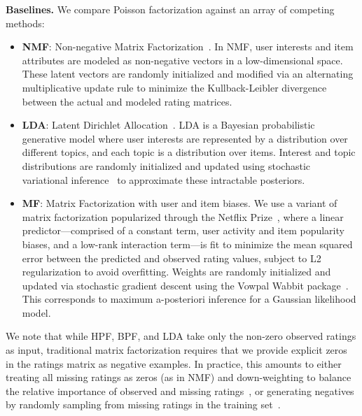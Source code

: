 {\bf Baselines.} We compare Poisson factorization against an array of
competing methods:
\begin{itemize}
  \item {\bf NMF}: Non-negative Matrix
    Factorization~\cite{Lee:1999}. In NMF, user interests and item
    attributes are modeled as non-negative vectors in a
    low-dimensional space. These latent vectors are randomly
    initialized and modified via an alternating multiplicative update
    rule to minimize the Kullback-Leibler divergence between the
    actual and modeled rating matrices.

  \item {\bf LDA}: Latent Dirichlet Allocation~\cite{Blei:2003b}. LDA
    is a Bayesian probabilistic generative model where user interests
    are represented by a distribution over different topics, and each
    topic is a distribution over items. Interest and topic
    distributions are randomly initialized and updated using
    stochastic variational inference~\cite{Hoffman:2010a} to
    approximate these intractable posteriors.

  \item {\bf MF}: Matrix Factorization with user and item biases. We
    use a variant of matrix factorization popularized through the
    Netflix Prize~\cite{Koren:2009}, where a linear
    predictor---comprised of a constant term, user activity and item
    popularity biases, and a low-rank interaction term---is fit to
    minimize the mean squared error between the predicted and observed
    rating values, subject to L2 regularization to avoid
    overfitting. Weights are randomly initialized and updated via
    stochastic gradient descent using the Vowpal Wabbit
    package~\cite{Weinberger:2009}. This corresponds to maximum
    a-posteriori inference for a Gaussian likelihood model.

\end{itemize}

We note that while HPF, BPF, and LDA take only the non-zero observed
ratings as input, traditional matrix factorization requires that we
provide explicit zeros in the ratings matrix as negative examples. In
practice, this amounts to either treating all missing ratings as zeros
(as in NMF) and down-weighting to balance the relative importance of
observed and missing ratings~\cite{Hu:2008p9402}, or generating
negatives by randomly sampling from missing ratings in the training
set~\cite{Dror:2012a}.

